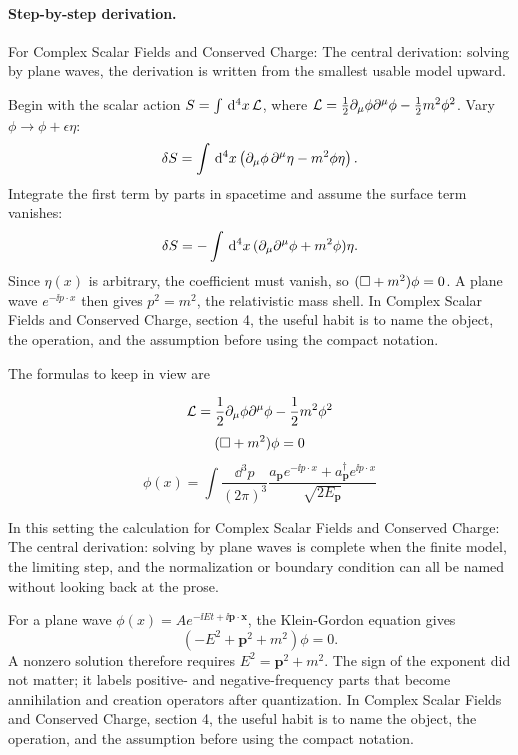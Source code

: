 \paragraph{Step-by-step derivation.}

For Complex Scalar Fields and Conserved Charge: The central derivation: solving by plane waves, the derivation is written from the smallest usable model upward.

Begin with the scalar action \(S=\int\,\mathrm d^4x\,\mathcal L\), where \(\mathcal L=\frac12\partial_\mu\phi\partial^\mu\phi-\frac12m^2\phi^2\).  Vary \(\phi\to\phi+\epsilon\eta\):
\[
  \delta S=\int\,\mathrm d^4x\left(\partial_\mu\phi\,\partial^\mu\eta-m^2\phi\eta\right).
\]
Integrate the first term by parts in spacetime and assume the surface term vanishes:
\[
  \delta S=-\int\,\mathrm d^4x\,(\partial_\mu\partial^\mu\phi+m^2\phi)\eta.
\]
Since \(\eta(x)\) is arbitrary, the coefficient must vanish, so \((\Box+m^2)\phi=0\).  A plane wave \(e^{-\ii p\cdot x}\) then gives \(p^2=m^2\), the relativistic mass shell.  In Complex Scalar Fields and Conserved Charge, section 4, the useful habit is to name the object, the operation, and the assumption before using the compact notation.

The formulas to keep in view are

\[
  \mathcal L=\frac12\partial_\mu\phi\partial^\mu\phi-\frac12m^2\phi^2
\]
\[
  (\Box+m^2)\phi=0
\]
\[
  \phi(x)=\int\frac{\dd^3p}{(2\pi)^3}\frac{a_{\bm p}e^{-\ii p\cdot x}+a_{\bm p}^\dagger e^{\ii p\cdot x}}{\sqrt{2E_{\bm p}}}
\]

In this setting the calculation for Complex Scalar Fields and Conserved Charge: The central derivation: solving by plane waves is complete when the finite model, the limiting step, and the normalization or boundary condition can all be named without looking back at the prose.




\begin{example}
For a plane wave \(\phi(x)=Ae^{-\ii Et+\ii\bm p\cdot\bm x}\), the Klein-Gordon equation gives
\[
  (-E^2+\bm p^2+m^2)\phi=0.
\]
A nonzero solution therefore requires \(E^2=\bm p^2+m^2\).  The sign of the exponent did not matter; it labels positive- and negative-frequency parts that become annihilation and creation operators after quantization.  In Complex Scalar Fields and Conserved Charge, section 4, the useful habit is to name the object, the operation, and the assumption before using the compact notation.
\end{example}



